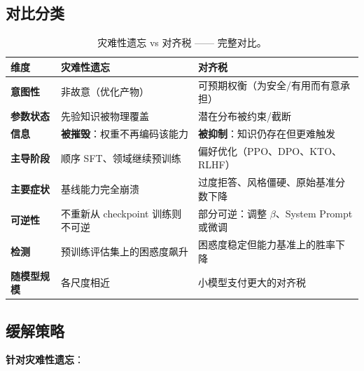 \subsection{对比分类}
\label{comparative-taxonomy}

\begin{table}[ht!]
\centering\small
\caption{灾难性遗忘 vs 对齐税 —— 完整对比。}
\noindent\begin{tabularx}{\linewidth}{@{}l Z{0.91} Z{1.09}@{}}
\toprule
\textbf{维度} & \textbf{灾难性遗忘} & \textbf{对齐税} \\
\midrule
\textbf{意图性} & 非故意（优化产物） & 可预期权衡（为安全/有用而有意承担） \\
\textbf{参数状态} & 先验知识被物理覆盖 & 潜在分布被约束/截断 \\
\textbf{信息} & \textbf{被摧毁}：权重不再编码该能力 & \textbf{被抑制}：知识仍存在但更难触发 \\
\textbf{主导阶段} & 顺序 SFT、领域继续预训练 & 偏好优化（PPO、DPO、KTO、RLHF） \\
\textbf{主要症状} & 基线能力完全崩溃 & 过度拒答、风格僵硬、原始基准分数下降 \\
\textbf{可逆性} & 不重新从 checkpoint 训练则不可逆 & 部分可逆：调整 $\beta$、System Prompt 或微调 \\
\textbf{检测} & 预训练评估集上的困惑度飙升 & 困惑度稳定但能力基准上的胜率下降 \\
\textbf{随模型规模} & 各尺度相近 & 小模型支付更大的对齐税 \\
\bottomrule
\end{tabularx}
\end{table}

\subsection{缓解策略}
\label{mitigation-strategies}

\textbf{针对灾难性遗忘}：

